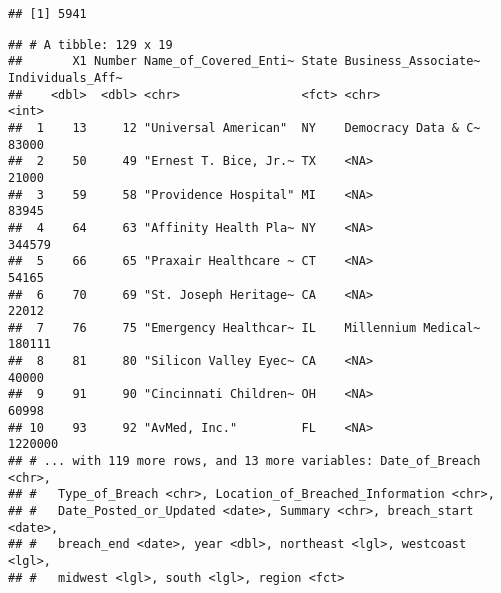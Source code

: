 \documentclass[
]{article}
\newenvironment{Shaded}{\begin{snugshade}}{\end{snugshade}}
\newcommand{\AttributeTok}[1]{\textcolor[rgb]{0.77,0.63,0.00}{#1}}
\newcommand{\ConstantTok}[1]{\textcolor[rgb]{0.00,0.00,0.00}{#1}}
\newcommand{\DecValTok}[1]{\textcolor[rgb]{0.00,0.00,0.81}{#1}}
\newcommand{\FloatTok}[1]{\textcolor[rgb]{0.00,0.00,0.81}{#1}}
\newcommand{\FunctionTok}[1]{\textcolor[rgb]{0.00,0.00,0.00}{#1}}
\newcommand{\NormalTok}[1]{#1}
\newcommand{\OtherTok}[1]{\textcolor[rgb]{0.56,0.35,0.01}{#1}}
\newcommand{\SpecialCharTok}[1]{\textcolor[rgb]{0.00,0.00,0.00}{#1}}
\begin{document}
\begin{verbatim}
## [1] 5941
\end{verbatim}

\begin{Shaded}
\end{Shaded}

\begin{verbatim}
## # A tibble: 129 x 19
##       X1 Number Name_of_Covered_Enti~ State Business_Associate~ Individuals_Aff~
##    <dbl>  <dbl> <chr>                 <fct> <chr>                          <int>
##  1    13     12 "Universal American"  NY    Democracy Data & C~            83000
##  2    50     49 "Ernest T. Bice, Jr.~ TX    <NA>                           21000
##  3    59     58 "Providence Hospital" MI    <NA>                           83945
##  4    64     63 "Affinity Health Pla~ NY    <NA>                          344579
##  5    66     65 "Praxair Healthcare ~ CT    <NA>                           54165
##  6    70     69 "St. Joseph Heritage~ CA    <NA>                           22012
##  7    76     75 "Emergency Healthcar~ IL    Millennium Medical~           180111
##  8    81     80 "Silicon Valley Eyec~ CA    <NA>                           40000
##  9    91     90 "Cincinnati Children~ OH    <NA>                           60998
## 10    93     92 "AvMed, Inc."         FL    <NA>                         1220000
## # ... with 119 more rows, and 13 more variables: Date_of_Breach <chr>,
## #   Type_of_Breach <chr>, Location_of_Breached_Information <chr>,
## #   Date_Posted_or_Updated <date>, Summary <chr>, breach_start <date>,
## #   breach_end <date>, year <dbl>, northeast <lgl>, westcoast <lgl>,
## #   midwest <lgl>, south <lgl>, region <fct>
\end{verbatim}
\end{document}
